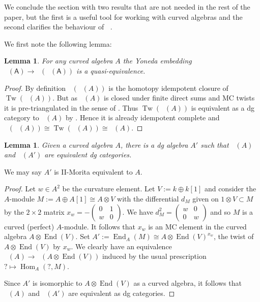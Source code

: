 \documentclass[a4paper]{amsart}
\theoremstyle{plain}
\newtheorem{lem}[thm]{Lemma}
\theoremstyle{definition}
\theoremstyle{remark}
\DeclareMathOperator{\End}{End}
\DeclareMathOperator{\Hom}{Hom}
\DeclareMathOperator{\PerfII}{Perf^{\mathrm{II}}}
\DeclareMathOperator{\Tw}{Tw}
\newcommand{\cat}[1]{\mathsf{#1}}
\numberwithin{equation}{section}
\theoremstyle{plain}
\begin{document}
	
	We conclude the section with two results that are not needed in the rest of the paper, but the first is a useful tool for working with curved algebras and the second clarifies the behaviour of $\PerfII$.
	
	We first note the following lemma:
	\begin{lem}	\label{L:perf4}
		For any curved algebra $A$ the Yoneda embedding 
		$\PerfII(\cat{A}) \to \PerfII(\PerfII(\cat{A}))$ is a quasi-equivalence.
	\end{lem}
	
	\begin{proof}
		By definition $\PerfII(\PerfII(A))$ is the homotopy idempotent closure of $\Tw(\PerfII(A))$. But as $\PerfII(A)$ is closed under finite direct sums and MC twists it is pre-triangulated in the sense of \cite{bk91}. 
		Thus  $\Tw(\PerfII(A))$ is equivalent as a dg category to $\PerfII(A)$ by \cite[Proposition 3.1]{bk91}.
		Hence it is already idempotent complete and $\PerfII(\PerfII(A)) \cong \Tw(\PerfII(A)) \cong \PerfII(A)$. 
	\end{proof}

	\begin{lem}\label{lem:uncurved}
	Given a curved algebra $A$, there is a dg algebra $A'$ such that $\PerfII(A)$ and $\PerfII(A')$ are equivalent dg categories.
\end{lem}
We may say $A'$ is II-Morita equivalent to $A$.
\begin{proof}	
	Let $w\in A^2$ be the curvature element. Let $V:=k\oplus k[1]$ and consider the $A$-module $M:=A\oplus A[1]\cong A\otimes V$ with the differential $d_M$ given on $1\otimes V\subset M$ by the $2\times 2$ matrix $x_w=-\begin{pmatrix}0&1\\w&0\end{pmatrix}$. 
	We have $d_M^2=\begin{pmatrix}w&0\\0&w\end{pmatrix}$ and so $M$ is a curved (perfect) $A$-module. It follows that $x_w$ is an MC element in the curved algebra $A\otimes \End(V)$. Set $A':=\End_A(M)\cong A\otimes \End(V)^{x_w}$, the twist of $A\otimes \End(V)$ by $x_w$.
	We clearly have an equivalence $\PerfII(A)\to\PerfII(A\otimes \End(V))$ induced by the usual prescription $?\mapsto \Hom_A(?,M)$. 
	
	Since $A'$ is isomorphic to $A\otimes \End(V)$ as a curved algebra, it follows that $\PerfII(A)$ and $\PerfII(A')$ are equivalent as dg categories. 
\end{proof}
\end{document}
